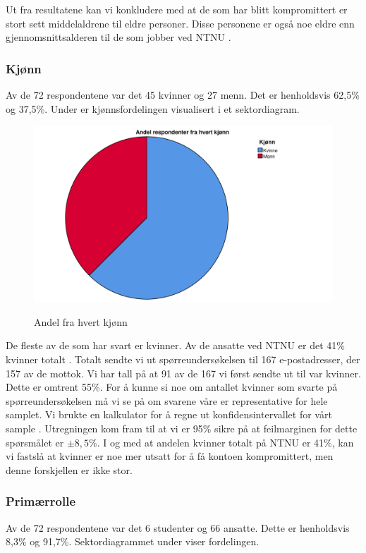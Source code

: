 Ut fra resultatene kan vi konkludere med at de som har blitt kompromittert er stort sett middelaldrene til eldre personer. Disse personene er også noe eldre enn gjennomsnittsalderen til de som jobber ved NTNU \cite{MorkRapport}. 

\subsubsection{Kjønn}
Av de 72 respondentene var det 45 kvinner og 27 menn. Det er henholdsvis 62,5\% og 37,5\%. Under er kjønnsfordelingen visualisert i et sektordiagram.

\begin{figure}[H]
    \centering
    \includegraphics[scale=0.5]{case_2/bilder/spss/kjonn.pdf}
    \label{fig:case2-kjonn}
    \caption[Andel fra hvert kjønn av de kompromitterte]{Andel fra hvert kjønn}
\end{figure}

De fleste av de som har svart er kvinner. Av de ansatte ved NTNU er det 41\% kvinner totalt \cite{NTNUfakta}. Totalt sendte vi ut spørreundersøkelsen til 167 e-postadresser, der 157 av de mottok. Vi har tall på at 91 av de 167 vi først sendte ut til var kvinner. Dette er omtrent 55\%. For å kunne si noe om antallet kvinner som svarte på spørreundersøkelsen må vi se på om svarene våre er representative for hele samplet. Vi brukte en kalkulator for å regne ut konfidensintervallet for vårt sample \cite{SSCalc}. Utregningen kom fram til at vi er 95\% sikre på at feilmarginen for dette spørsmålet er \(\pm 8,5\%\). I og med at andelen kvinner totalt på NTNU er 41\%, kan vi fastslå at kvinner er noe mer utsatt for å få kontoen kompromittert, men denne forskjellen er ikke stor.

\subsubsection{Primærrolle}
Av de 72 respondentene var det 6 studenter og 66 ansatte. Dette er henholdsvis 8,3\% og 91,7\%. Sektordiagrammet under viser fordelingen.

